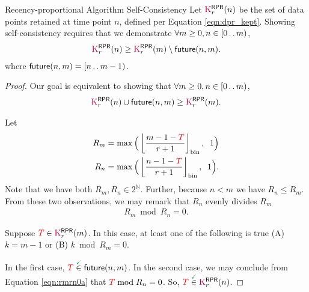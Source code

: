 \begin{theorem}{Recency-proportional Algorithm Self-Consistency}
\label{thm:recency-proportional-algo-self-consistency}
Let $\colorK^{\mathsf{RPR}}_r(n)$ be the set of data points retained at time point $n$, defined per Equation \ref{eqn:dpr_kept}.
Showing self-consistency requires that we demonstrate $\forall m \geq 0, n \in [0 \mathinner {\ldotp \ldotp} m)$,
\begin{align*}
\colorK^{\mathsf{RPR}}_r(n)
\geq
\colorK^{\mathsf{RPR}}_r(m)
\setminus
\mathsf{future}(n, m).
\end{align*}
where $\mathsf{future}(n, m) = [n \mathinner {\ldotp \ldotp} m - 1)$.
\end{theorem}

\begin{proof}
\label{prf:recency-proportional-algo-self-consistency}
Our goal is equivalent to showing that $\forall m \geq 0, n \in [0 \mathinner {\ldotp \ldotp} m)$,
\begin{align*}
\colorK^{\mathsf{RPR}}_r(n) \cup \mathsf{future}(n, m) \geq \colorK^{\mathsf{RPR}}_r(m).
\end{align*}

Let
\begin{align*}
R_m
&=
\max\Big(\left \lfloor \frac{m  - 1 - \colorTbar}{r + 1} \right \rfloor_{\mathrm{bin}}, \;\; 1\Big)\\
R_n
&=
\max\Big(\left \lfloor \frac{n  - 1 - \colorTbar}{r + 1} \right \rfloor_{\mathrm{bin}}, \;\; 1\Big).
\end{align*}
Note that we have both $R_m, R_n \in 2^{\mathbb{N}}$.
Further, because $n < m$ we have $R_n \leq R_m$.
From these two observations, we may remark that $R_n$ evenly divides $R_m$
\begin{align}
R_m \bmod R_n = 0.
\label{eqn:rmrn0a}
\end{align}

Suppose $\colorTbar \in \colorK^{\mathsf{RPR}}_r(m)$.
In this case, at least one of the following is true (A) $k = m - 1$ or (B) $k \bmod R_m = 0$.

In the first case, $\colorTbar \stackrel{\checkmark}{\in} \mathsf{future}(n, m)$.
In the second case, we may conclude from Equation \ref{eqn:rmrn0a} that $\colorTbar \bmod R_n = 0$.
So, $\colorTbar \stackrel{\checkmark}{\in} \colorK^{\mathsf{RPR}}_r(n)$.
\end{proof}
